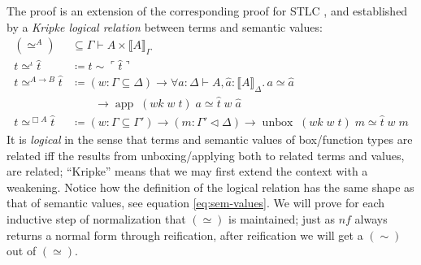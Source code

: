 \documentclass[12pt,twoside,openright]{report}
\numberwithin{equation}{chapter}
\numberwithin{figure}{chapter}
\numberwithin{table}{chapter}
\theoremstyle{definition}\newtheorem{definition}{Definition}
\begin{document}
The proof is an extension of the corresponding proof for STLC \cite{kovacs17},
and established by a \emph{Kripke logical relation} \cite{plotkin73}
between terms and semantic values:
\begin{align*}
  (\simeq^A) &\subseteq \Gamma \vdash A \times \llbracket A \rrbracket_\Gamma \\
  t \simeq^\iota \hat t &\coloneqq t \sim \ulcorner \hat t \urcorner \\
  t \simeq^{A \to B} \hat t &\coloneqq (w : \Gamma \subseteq \Delta) \to \forall a : \Delta \vdash A, \hat a : \llbracket A \rrbracket_\Delta.\, a \simeq \hat a \\
  &\qquad \to \operatorname{app} \; (\textit{wk} \; w \; t) \; a \simeq \hat t \; w \; \hat a \\
  t \simeq^{\Box A} \hat t &\coloneqq (w : \Gamma \subseteq \Gamma') \to (m : \Gamma' \lhd \Delta)
  \to \operatorname{unbox} \; (\textit{wk} \; w \; t) \; m \simeq \hat t \; w \; m
\end{align*}
It is \emph{logical} in the sense that terms and semantic values of box/function types
are related iff the results from unboxing/applying both to related terms and values, are related;
``Kripke'' means that we may first extend the context with a weakening.
Notice how the definition of the logical relation has the same shape
as that of semantic values, see equation \eqref{eq:sem-values}.
We will prove for each inductive step of normalization that $(\simeq)$ is maintained;
just as $\textit{nf}$ always returns a normal form through reification,
after reification we will get a $(\sim)$ out of $(\simeq)$.
\end{document}
